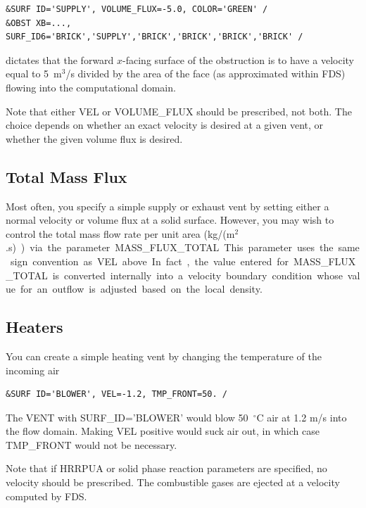 \documentclass[11pt]{book}
\begin{document}
\begin{lstlisting}
&SURF ID='SUPPLY', VOLUME_FLUX=-5.0, COLOR='GREEN' /
&OBST XB=..., SURF_ID6='BRICK','SUPPLY','BRICK','BRICK','BRICK','BRICK' /
\end{lstlisting}

\noindent
dictates that the forward $x$-facing surface of the obstruction is to have a velocity
equal to 5~m$^3$/s divided by the area of the face (as approximated within FDS) flowing into the
computational domain.


Note that either {\ct VEL} or {\ct VOLUME\_FLUX} should be prescribed,
not both.  The choice depends on whether an exact velocity is desired at a
given vent, or whether the given volume flux is desired.


\subsection{Total Mass Flux}

\label{info:MASS_FLUX_TOTAL}

Most often, you specify a simple supply or exhaust vent by setting either a normal velocity or volume flux at a solid surface. However, you may wish to control the total mass flow rate per unit area (\si{kg/(m$^2$.s)}) via the parameter {\ct MASS\_FLUX\_TOTAL}. This parameter uses the same sign convention as {\ct VEL} above.  In fact, the value entered for {\ct MASS\_FLUX\_TOTAL} is converted internally into a velocity boundary condition whose value for an outflow is adjusted based on the local density.


\subsection{Heaters}

You can create a simple heating vent by changing the temperature of the incoming air

\begin{lstlisting}
&SURF ID='BLOWER', VEL=-1.2, TMP_FRONT=50. /
\end{lstlisting}

\noindent
The {\ct VENT} with {\ct SURF\_ID='BLOWER'} would blow 50~$^\circ$C
air at 1.2 m/s into the flow domain. Making {\ct VEL} positive would
suck air out, in which case {\ct TMP\_FRONT} would not be necessary.

Note that if {\ct HRRPUA} or solid phase reaction parameters are
specified, no velocity should be prescribed. The combustible gases
are ejected at a velocity computed by FDS.
\end{document}
